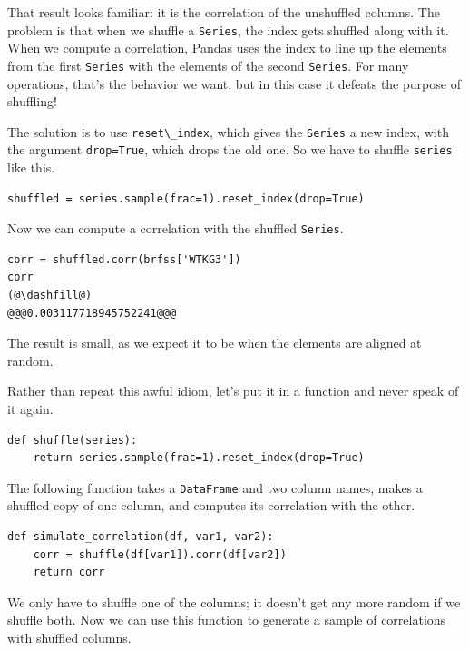 That result looks familiar: it is the correlation of the unshuffled
columns. The problem is that when we shuffle a
\passthrough{\lstinline!Series!}, the index gets shuffled along with it.
When we compute a correlation, Pandas uses the index to line up the
elements from the first \passthrough{\lstinline!Series!} with the
elements of the second \passthrough{\lstinline!Series!}. For many
operations, that's the behavior we want, but in this case it defeats the
purpose of shuffling!

The solution is to use \passthrough{\lstinline!reset\_index!}, which
gives the \passthrough{\lstinline!Series!} a new index, with the
argument \passthrough{\lstinline!drop=True!}, which drops the old one.
So we have to shuffle \passthrough{\lstinline!series!} like this.

\begin{lstlisting}[]
shuffled = series.sample(frac=1).reset_index(drop=True)
\end{lstlisting}

Now we can compute a correlation with the shuffled
\passthrough{\lstinline!Series!}.

\begin{lstlisting}[]
corr = shuffled.corr(brfss['WTKG3'])
corr
(@\dashfill@)
@@@0.003117718945752241@@@
\end{lstlisting}

The result is small, as we expect it to be when the elements are aligned
at random.

Rather than repeat this awful idiom, let's put it in a function and
never speak of it again.

\begin{lstlisting}[]
def shuffle(series):
    return series.sample(frac=1).reset_index(drop=True)
\end{lstlisting}

The following function takes a \passthrough{\lstinline!DataFrame!} and
two column names, makes a shuffled copy of one column, and computes its
correlation with the other.

\begin{lstlisting}[]
def simulate_correlation(df, var1, var2):
    corr = shuffle(df[var1]).corr(df[var2])
    return corr
\end{lstlisting}

We only have to shuffle one of the columns; it doesn't get any more
random if we shuffle both. Now we can use this function to generate a
sample of correlations with shuffled columns.

